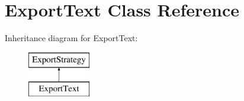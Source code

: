 \hypertarget{class_export_text}{\section{Export\-Text Class Reference}
\label{class_export_text}
}
Inheritance diagram for Export\-Text\-:\begin{figure}[H]
\begin{center}
\leavevmode
\includegraphics[height=2.000000cm]{class_export_text}
\end{center}
\end{figure}
